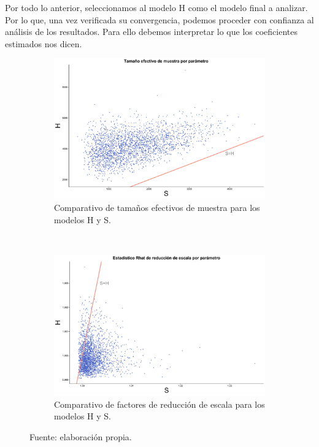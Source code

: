   Por todo lo anterior, seleccionamos al modelo H como el modelo final a analizar. Por lo que, una vez verificada su convergencia, podemos proceder con confianza al análisis de los resultados. Para ello debemos interpretar lo que los coeficientes estimados nos dicen. 

\begin{figure}[H]
	\centering
	\begin{subfigure}{0.6\textwidth}
	\includegraphics[width = \textwidth]{Figs/Convergencia/Compara_n_eff}
	\caption{Comparativo de tamaños efectivos de muestra para los modelos H y S.}
	\label{fig:N_eff_compara}
	\end{subfigure}\\[3ex]
	\begin{subfigure}{0.6\textwidth}
	\includegraphics[width = \textwidth]{Figs/Convergencia/Compara_Rhat}
	\caption{Comparativo de factores de reducción de escala para los modelos H y S.}
	\label{fig:Rhat_compara}
	\end{subfigure}
	\caption{Fuente: elaboración propia.}
\end{figure} 
 
